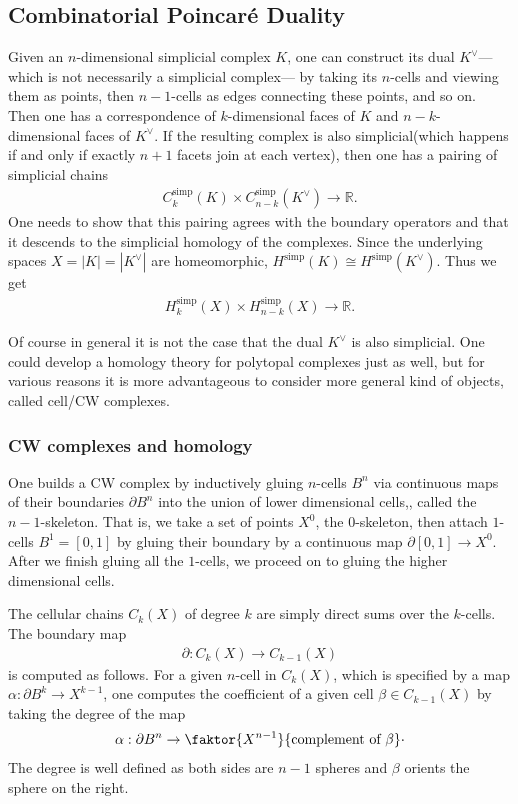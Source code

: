 \documentclass[12pt]{amsart}
\newcommand{\R}{\mathbb{R}} %
\theoremstyle{remark}
\begin{document}
\subsection{Combinatorial Poincaré Duality}
Given an $n$-dimensional simplicial complex $K$, one can construct its dual $K^\vee$—which is not necessarily a simplicial complex— by taking its $n$-cells and viewing them as points, then $n-1$-cells as edges connecting these points, and so on. Then one has a correspondence of $k$-dimensional faces of $K$ and $ n-k$-dimensional faces of $K^\vee$. If the resulting complex is also simplicial(which happens if and only if exactly $n+1$ facets join at each vertex), then one has a pairing of simplicial chains
\begin{align*}
    C_k^{\text{simp}} ( K) \times C_{n-k}^{\text{simp}} (K^\vee) \xrightarrow{ }  \R.
\end{align*}
One needs to show that this pairing agrees with the boundary operators and that it descends to the simplicial homology of the complexes. Since the underlying spaces $ X = |K| = |K^\vee|$ are homeomorphic, $ H^{\text{simp}} ( K) \cong H^{\text{simp}} ( K^\vee)  $. Thus we get 
\begin{align*}
    H_k^{\text{simp}} ( X) \times H_{n-k}^{\text{simp}} (X)\xrightarrow{} \R. 
\end{align*}

Of course in general it is not the case that the dual $ K^\vee$ is also simplicial. One could develop a homology theory for polytopal complexes just as well, but for various reasons it is more advantageous to consider more general kind of objects, called cell/CW complexes. 

\subsubsection{CW complexes and homology}
One builds a CW complex by inductively gluing $n$-cells $ B^n$ via continuous maps of their boundaries $ \partial B^n$ into the union of lower dimensional cells,, called the $n-1$-skeleton.  That is, we take a set of points $X^0$, the $0$-skeleton, then attach $1$-cells $B^1 = [0,1]$ by  gluing their boundary by a continuous map $ \partial [0,1] \xrightarrow{} X^0$. After we finish gluing all the $1$-cells, we proceed on to gluing the higher dimensional cells.

The cellular chains $C_k (X)$ of degree $k$ 
 are simply direct sums over the $k$-cells. The boundary map 
\begin{align*}
    \partial: C_k (X) \rightarrow C_{k-1} (X)
 \end{align*}
 is computed as follows. For a given $n$-cell in $ C_k ( X)$, which is specified by a map $ \alpha: \partial B^k\rightarrow X^{k-1}$, one computes the coefficient of a given cell $ \beta \in C_{k-1}(X)$ by taking the degree of the map
 \begin{align*}
     \alpha :\partial B^n  \rightarrow \faktor{X^{n-1}}{\text{complement of } \beta}\cdot 
 \end{align*}
 The degree is well defined as both sides are $n-1$ spheres and $ \beta$ orients the sphere on the right.
\end{document}
